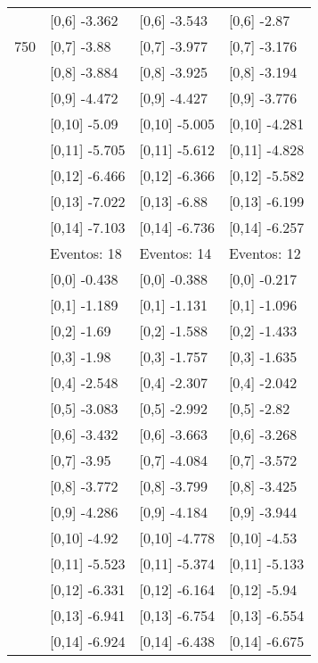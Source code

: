 \begin{table}
\begin{tabular}[t]{llll}
 & {}[0,6] -3.362 & {}[0,6] -3.543 & {}[0,6] -2.87\\
750 & {}[0,7] -3.88 & {}[0,7] -3.977 & {}[0,7] -3.176\\
\addlinespace
 & {}[0,8] -3.884 & {}[0,8] -3.925 & {}[0,8] -3.194\\
 & {}[0,9] -4.472 & {}[0,9] -4.427 & {}[0,9] -3.776\\
 & {}[0,10] -5.09 & {}[0,10] -5.005 & {}[0,10] -4.281\\
 & {}[0,11] -5.705 & {}[0,11] -5.612 & {}[0,11] -4.828\\
 & {}[0,12] -6.466 & {}[0,12] -6.366 & {}[0,12] -5.582\\
\addlinespace
 & {}[0,13] -7.022 & {}[0,13] -6.88 & {}[0,13] -6.199\\
 & {}[0,14] -7.103 & {}[0,14] -6.736 & {}[0,14] -6.257\\
 & Eventos:  18 & Eventos:  14 & Eventos:  12\\
 & {}[0,0] -0.438 & {}[0,0] -0.388 & {}[0,0] -0.217\\
 & {}[0,1] -1.189 & {}[0,1] -1.131 & {}[0,1] -1.096\\
\addlinespace
 & {}[0,2] -1.69 & {}[0,2] -1.588 & {}[0,2] -1.433\\
 & {}[0,3] -1.98 & {}[0,3] -1.757 & {}[0,3] -1.635\\
 & {}[0,4] -2.548 & {}[0,4] -2.307 & {}[0,4] -2.042\\
 & {}[0,5] -3.083 & {}[0,5] -2.992 & {}[0,5] -2.82\\
 & {}[0,6] -3.432 & {}[0,6] -3.663 & {}[0,6] -3.268\\
\addlinespace
1000 & {}[0,7] -3.95 & {}[0,7] -4.084 & {}[0,7] -3.572\\
 & {}[0,8] -3.772 & {}[0,8] -3.799 & {}[0,8] -3.425\\
 & {}[0,9] -4.286 & {}[0,9] -4.184 & {}[0,9] -3.944\\
 & {}[0,10] -4.92 & {}[0,10] -4.778 & {}[0,10] -4.53\\
 & {}[0,11] -5.523 & {}[0,11] -5.374 & {}[0,11] -5.133\\
\addlinespace
 & {}[0,12] -6.331 & {}[0,12] -6.164 & {}[0,12] -5.94\\
 & {}[0,13] -6.941 & {}[0,13] -6.754 & {}[0,13] -6.554\\
 & {}[0,14] -6.924 & {}[0,14] -6.438 & {}[0,14] -6.675\\
\bottomrule
\end{tabular}
\end{table}
